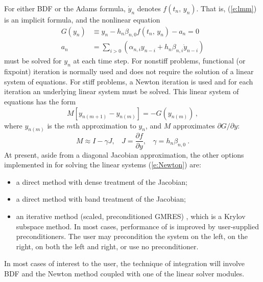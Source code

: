 For either BDF or the Adams formula, $\dot{y}_n$ denotes
$f(t_n,\,y_n)$. That is, (\ref{e:lmm}) is an implicit formula, and 
the nonlinear equation 
\begin{equation}\label{e:nonlinear}
\begin{split}
G(y_n) &\equiv  y_n-h_n\beta_{n,0}f(t_n,\,y_n) - a_n=0   \\
a_n &= \sum_{i>0}(\alpha_{n,i}y_{n-i}+h_n\beta_{n,i}\dot{y}_{n-i}) 
\end{split}
\end{equation}
must be solved for $y_{n}$ at each time step. For nonstiff problems,
functional (or fixpoint) iteration is normally used and does not
require the solution of a linear system of equations. For stiff
problems, a Newton iteration is used and for each iteration an
underlying linear system must be solved. This linear system of
equations has the form
\begin{equation}\label{e:Newton}
M[y_{n(m+1)}-y_{n(m)}]=-G(y_{n(m)}) \, ,
\end{equation}
where $y_{n(m)}$ is the $m$th approximation to $y_n$, and $M$
approximates $\partial G/ \partial y$:
\begin{equation} \label{e:N_Matrix}
M \approx I-\gamma J, ~~~~ J = \frac{\partial f}{\partial y}, ~~~~
    \gamma = h_n\beta_{n,0} ~.
\end{equation}
At present, aside from a diagonal Jacobian approximation, the other
options implemented in {\cvodes} for solving the linear systems
(\ref{e:Newton}) are:
\begin{itemize}
\item a direct method with dense treatment of the Jacobian;
\item a direct method with band treatment of the Jacobian;
\item an iterative method {\spgmr} (scaled, preconditioned
GMRES) \cite{BrHi89}, which is a Krylov subspace method. In most
cases, performance of {\spgmr} is improved by user-supplied
preconditioners. The user may precondition the system on the left, on
the right, on both the left and right, or use no preconditioner.
\end{itemize}
In most cases of interest to the {\cvodes} user, the technique of
integration will involve BDF and the Newton method coupled with one of the 
linear solver modules.

